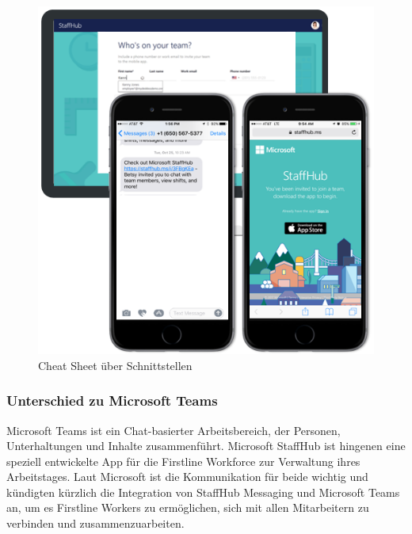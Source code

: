 \begin{figure}[H] 
\centering 
\includegraphics[scale=0.72]{images/invite} 
\caption[Cheat Sheet über Schnittstellen]{Cheat Sheet über Schnittstellen\protect} 
\label{ws} 
\end{figure}

\subsubsection{Unterschied zu Microsoft Teams}
Microsoft Teams ist ein Chat-basierter Arbeitsbereich, der Personen, Unterhaltungen und Inhalte zusammenführt. Microsoft StaffHub ist hingenen eine speziell entwickelte App für die Firstline Workforce zur Verwaltung ihres Arbeitstages. Laut Microsoft ist die Kommunikation für beide wichtig und kündigten kürzlich die Integration von StaffHub Messaging und Microsoft Teams an, um es Firstline Workers zu ermöglichen, sich mit allen Mitarbeitern zu verbinden und zusammenzuarbeiten.
 
